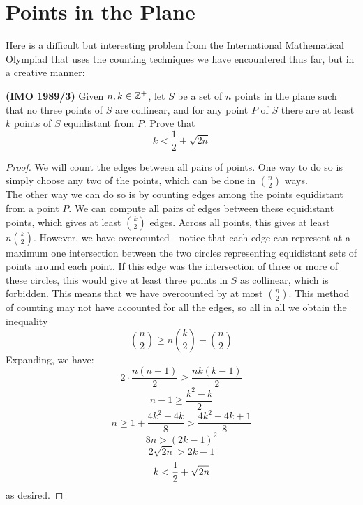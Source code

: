 \section{Points in the Plane}
Here is a difficult but interesting problem from the International Mathematical Olympiad that uses the counting techniques we have encountered thus far, but in a creative manner:
\begin{problem}{1} 
\textbf{(IMO 1989/3)} Given $n, k \in \mathbb{Z}^+$, let $S$ be a set of $n$ points in the plane such that no three points of $S$ are collinear, and for any point $P$ of $S$ there are at least $k$ points of $S$ equidistant from $P$. Prove that 
\[
	k < \frac{1}{2} + \sqrt{2n}
\]
\end{problem}

\begin{proof}
We will count the edges between all pairs of points. One way to do so is simply choose any two of the points, which can be done in $\binom{n}{2}$ ways. \\
	The other way we can do so is by counting edges among the points equidistant from a point $P$. We can compute all pairs of edges between these equidistant points, which gives at least $\binom{k}{2}$ edges. Across all points, this gives at least $n\binom{k}{2}$. However, we have overcounted - notice that each edge can represent at a maximum one intersection between the two circles representing equidistant sets of points around each point. If this edge was the intersection of three or more of these circles, this would give at least three points in $S$ as collinear, which is forbidden. This means that we have overcounted by at most $\binom{n}{2}$. This method of counting may not have accounted for all the edges, so all in all we obtain the inequality 
\[
	\binom{n}{2} \geq n\binom{k}{2} - \binom{n}{2}
\]
Expanding, we have: 
\[
	2\cdot \frac{n(n-1)}{2} \geq \frac{nk(k-1)}{2}
\] 
\[
	n - 1 \geq \frac{k^2 - k}{2}
\]
\[
	n \geq 1 + \frac{4k^2 - 4k}{8} > \frac{4k^2 - 4k + 1}{8}
\]	
\[
	8n > (2k-1)^2
\]
\[
	2\sqrt{2n} > 2k - 1
\]
\[
	k < \frac{1}{2} + \sqrt{2n}
\]
as desired.
\end{proof}

